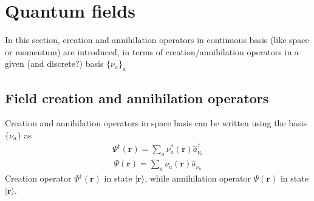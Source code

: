 \documentclass[letterpaper,10pt,english]{jupyterBook}
\begin{document}
\sphinxstepscope


\section{Quantum fields}
\label{\detokenize{ch/quantum-mechanics/many-body/quantum-fields:quantum-fields}}\label{\detokenize{ch/quantum-mechanics/many-body/quantum-fields:quantum-mechanics-second-quantizazion-quantum-fields}}\label{\detokenize{ch/quantum-mechanics/many-body/quantum-fields::doc}}
\sphinxAtStartPar
In this section, creation and annihilation operators in continuous basis (like space or momentum) are introduced, in terms of creation/annihilation operators in a given (and discrete?) basis \(\{ \nu_a \}_a\)




\subsection{Field creation and annihilation operators}
\label{\detokenize{ch/quantum-mechanics/many-body/quantum-fields:field-creation-and-annihilation-operators}}
\sphinxAtStartPar
Creation and annihilation operators in space basis can be written using the basis \(\{ \nu_a \}\) as
\begin{equation}\label{equation:ch/quantum-mechanics/many-body/quantum-fields:eq:qft:fields:creation}
\begin{split}\Psi^\dagger(\mathbf{r}) = \sum_a \nu_a^*(\mathbf{r}) \hat{a}^\dagger_{\nu_a}\end{split}
\end{equation}\begin{equation}\label{equation:ch/quantum-mechanics/many-body/quantum-fields:eq:qft:fields:annihilation}
\begin{split}\Psi        (\mathbf{r}) = \sum_a \nu_a  (\mathbf{r}) \hat{a}_{\nu_a}        \end{split}
\end{equation}
\sphinxAtStartPar
Creation operator \(\Psi^\dagger(\mathbf{r})\)  in state \(| \mathbf{r} \rangle\), while annihilation operator \(\Psi(\mathbf{r})\)  in state \(| \mathbf{r} \rangle\).
\end{document}
